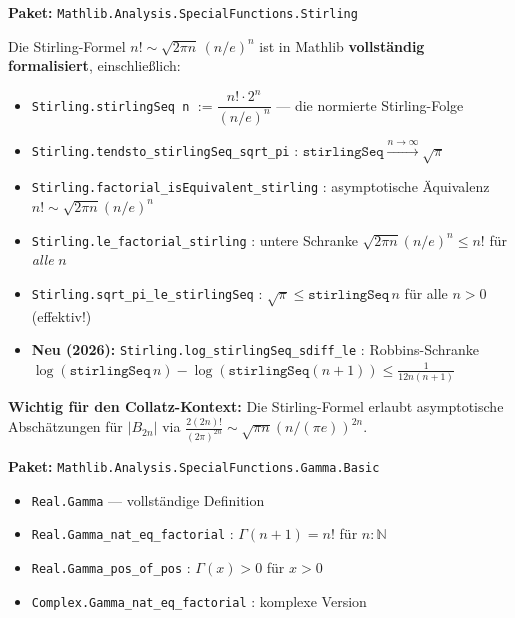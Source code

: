\documentclass[12pt,a4paper]{article}
\newcommand{\N}{\mathbb{N}}
\newcommand{\Mathlib}[1]{\texttt{Mathlib.\allowbreak #1}}
\begin{document}
\begin{tcolorbox}[vorhanden,
  title={Formalisiert: Stirling-Formel (vollständig)}]
\textbf{Paket:} \Mathlib{Analysis.SpecialFunctions.Stirling}

\medskip
Die Stirling-Formel $n! \sim \sqrt{2\pi n}\,(n/e)^n$ ist in Mathlib
\textbf{vollständig formalisiert}, einschließlich:

\begin{itemize}[nosep]
  \item \texttt{Stirling.stirlingSeq n} $:= \dfrac{n!\cdot 2^n}{(n/e)^n}$
    --- die normierte Stirling-Folge
  \item \texttt{Stirling.tendsto\_stirlingSeq\_sqrt\_pi} :
    $\texttt{stirlingSeq} \xrightarrow{n\to\infty} \sqrt{\pi}$
  \item \texttt{Stirling.factorial\_isEquivalent\_stirling} :
    asymptotische Äquivalenz $n! \sim \sqrt{2\pi n}(n/e)^n$
  \item \texttt{Stirling.le\_factorial\_stirling} :
    untere Schranke $\sqrt{2\pi n}(n/e)^n \leq n!$ für \emph{alle} $n$
  \item \texttt{Stirling.sqrt\_pi\_le\_stirlingSeq} :
    $\sqrt{\pi} \leq \texttt{stirlingSeq}\,n$ für alle $n > 0$ (effektiv!)
  \item \textbf{Neu (2026):} \texttt{Stirling.log\_stirlingSeq\_sdiff\_le} :
    Robbins-Schranke $\log(\texttt{stirlingSeq}\,n) - \log(\texttt{stirlingSeq}(n+1))
    \leq \tfrac{1}{12n(n+1)}$
\end{itemize}

\textbf{Wichtig für den Collatz-Kontext:}
Die Stirling-Formel erlaubt asymptotische Abschätzungen für $|B_{2n}|$
via $\frac{2(2n)!}{(2\pi)^{2n}} \sim \sqrt{\pi n}(n/(\pi e))^{2n}$.
\end{tcolorbox}

\begin{tcolorbox}[vorhanden, title={Formalisiert: Gamma-Funktion}]
\textbf{Paket:} \Mathlib{Analysis.SpecialFunctions.Gamma.Basic}

\begin{itemize}[nosep]
  \item \texttt{Real.Gamma} --- vollständige Definition
  \item \texttt{Real.Gamma\_nat\_eq\_factorial} :
    $\Gamma(n+1) = n!$ für $n:\N$
  \item \texttt{Real.Gamma\_pos\_of\_pos} : $\Gamma(x) > 0$ für $x > 0$
  \item \texttt{Complex.Gamma\_nat\_eq\_factorial} : komplexe Version
\end{itemize}
\end{tcolorbox}
\end{document}
